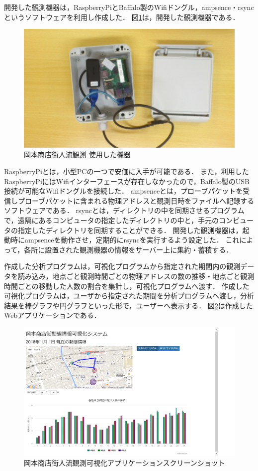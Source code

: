 開発した観測機器は，RaspberryPiとBaffalo製のWifiドングル，ampsence・rsyncというソフトウェアを利用し作成した．
図\ref{fig:okamoto_pict1}は，開発した観測機器である．
\begin{figure}[htbp]
\includegraphics[width=16cm]{images/okamoto_pict1.png}
\caption{岡本商店街人流観測 使用した機器}
\label{fig:okamoto_pict1}
\end{figure}
RaspberryPiとは，小型PCの一つで安価に入手が可能である．
また，利用したRaspberryPiにはWifiインターフェースが存在しなかったので，Baffalo製のUSB接続が可能なWifiドングルを接続した．
ampsenceとは，プローブパケットを受信しプローブパケットに含まれる物理アドレスと観測日時をファイルへ記録するソフトウェアである．
rsyncとは，ディレクトリの中を同期させるプログラムで，遠隔にあるコンピュータの指定したディレクトリの中と，手元のコンピュータの指定したディレクトリを同期することができる．
開発した観測機器は，起動時にampsenceを動作させ，定期的にrsyncを実行するよう設定した．
これによって，各所に設置された観測機器の情報をサーバー上に集約・蓄積する．

作成した分析プログラムは，可視化プログラムから指定された期間内の観測データを読み込み，地点ごと観測時間ごとの物理アドレスの数の推移・地点ごと観測時間ごとの移動した人数の割合を集計し，可視化プログラムへ渡す．
作成した可視化プログラムは，ユーザから指定された期間を分析プログラムへ渡し，分析結果を棒グラフや円グラフといった形で，ユーザーへ表示する．
図\ref{fig:okamoto_ss}は作成したWebアプリケーションである．
\begin{figure}[htbp]
\includegraphics[width=16cm]{images/okamoto_scr1.png}
\caption{岡本商店街人流観測可視化アプリケーションスクリーンショット}
\label{fig:okamoto_ss}
\end{figure}

